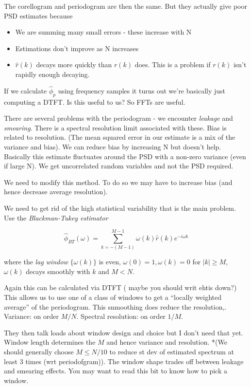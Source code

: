 \documentclass[11pt]{article}
\begin{document}
    The corellogram and periodogram are then the same. But they actually give poor PSD estimates
    because
    \begin{itemize}
        \item We are summing many small errors - these increase with N
        \item Estimations don't improve as N increases
        \item $\hat{r}(k)$ decays more quickly than $r(k)$ does. This is a problem if $r(k)$ isn't
            rapidly enough decaying.
    \end{itemize}

If we calculate $\hat{\phi}_p$ using frequency samples it turns out we're basically just computing
a DTFT. {\color{red} Is this useful to us?} So FFTs are useful.

There are several problems with the periodogram - we encounter \emph{leakage} and
\emph{smearing}. There is a spectral resolution limit associated with these. Bias is related to
resolution. (The mean squared error in our estimate is a mix of the variance and bias). We can
reduce bias by increasing N but doesn't help. Basically this estimate fluctuates around the PSD
with a non-zero variance (even if large N). We get uncorrelated random variables and not the PSD
required.

We need to modify this method. To do so we may have to increase bias (and hence decrease
average resolution).

We need to get rid of the high statistical variability that is the main problem. Use the
\emph{Blackman-Tukey estimator}

\begin{equation}
    \hat{\phi}_{BT} (\omega) = \sum_{k = -(M-1)}^{M-1} \omega(k)
    \hat{r}(k)e^{-i\omega k}
\end{equation}

where the \emph{lag window} $\{ \omega(k) \}$ is even, $\omega(0) = 1, \omega(k ) = 0$ for $|k| \geq M$, $\omega(k)$
decays smoothly with $k$ and $M < N$. 

Again this can be calculated via DTFT ({\color{red} maybe you should writ ehtis down?}) This allows
us to use one of a class of windows to get a ``locally weighted average'' of the periodogram.
This snmoothing does reduce the resolution,. Variance: on order $M/N$. Spectral resolution: on
order $1/M$.

They then talk loads about window design and choice but I don't need that yet. Window length
determines the $M$ and hence variance and resolution. *(We should generally choose $M \leq N/10$
to reduce st dev of estimated spectrum at least 3 times (wrt periodofgram)). The window shape
trades off between leakage and smearing effects. You may want to {\color{red} read this bit} to
know how to pick a window.
\end{document}

